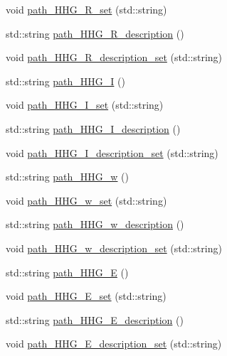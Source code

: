 \begin{DoxyCompactItemize}
\item 
void \hyperlink{class_config___settings_a58c007f4907c10fe8b7e560d86b002ae}{path\+\_\+\+H\+H\+G\+\_\+\+R\+\_\+set} (std\+::string)
\item 
std\+::string \hyperlink{class_config___settings_a2221e36280a3b77e933a6af8b6a59e53}{path\+\_\+\+H\+H\+G\+\_\+\+R\+\_\+description} ()
\item 
void \hyperlink{class_config___settings_acbc8c236f193ad3d9321d027fc21e808}{path\+\_\+\+H\+H\+G\+\_\+\+R\+\_\+description\+\_\+set} (std\+::string)
\item 
std\+::string \hyperlink{class_config___settings_a58c8f25ad066125337de709c4cbdeb16}{path\+\_\+\+H\+H\+G\+\_\+I} ()
\item 
void \hyperlink{class_config___settings_ac3c7c4d9d31c685505f3d43e937ebb96}{path\+\_\+\+H\+H\+G\+\_\+\+I\+\_\+set} (std\+::string)
\item 
std\+::string \hyperlink{class_config___settings_a7df6f37f97c253c126176d7b85f13a4b}{path\+\_\+\+H\+H\+G\+\_\+\+I\+\_\+description} ()
\item 
void \hyperlink{class_config___settings_ac67474168004d24797eb2352d8dec72b}{path\+\_\+\+H\+H\+G\+\_\+\+I\+\_\+description\+\_\+set} (std\+::string)
\item 
std\+::string \hyperlink{class_config___settings_a169401737860521cad3b82690a78fbc6}{path\+\_\+\+H\+H\+G\+\_\+w} ()
\item 
void \hyperlink{class_config___settings_a7ae775beb17b7bf9add95ca497b432d8}{path\+\_\+\+H\+H\+G\+\_\+w\+\_\+set} (std\+::string)
\item 
std\+::string \hyperlink{class_config___settings_a55bd8ab1e25d6b487243906ef9798c24}{path\+\_\+\+H\+H\+G\+\_\+w\+\_\+description} ()
\item 
void \hyperlink{class_config___settings_a7ebf94a7dcf52ffb4577288a4f490741}{path\+\_\+\+H\+H\+G\+\_\+w\+\_\+description\+\_\+set} (std\+::string)
\item 
std\+::string \hyperlink{class_config___settings_a54013e9cb8e7e168f24fb596a8755513}{path\+\_\+\+H\+H\+G\+\_\+E} ()
\item 
void \hyperlink{class_config___settings_a60261be48de388607d81a4351e802937}{path\+\_\+\+H\+H\+G\+\_\+\+E\+\_\+set} (std\+::string)
\item 
std\+::string \hyperlink{class_config___settings_a12b8bc7cf9db4c1f6a5c5a2ec3ff591b}{path\+\_\+\+H\+H\+G\+\_\+\+E\+\_\+description} ()
\item 
void \hyperlink{class_config___settings_aa37390d2e24d643c3e1f8b68bba4251b}{path\+\_\+\+H\+H\+G\+\_\+\+E\+\_\+description\+\_\+set} (std\+::string)

\end{DoxyCompactItemize}
